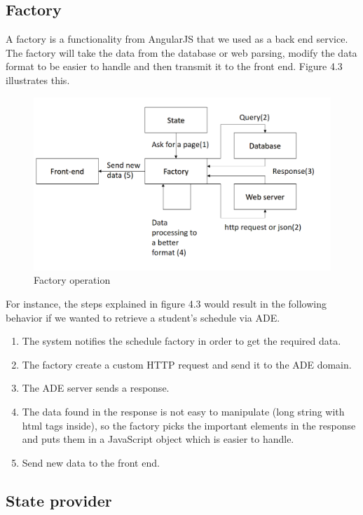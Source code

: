 \documentclass{eplmastersthesis}
\begin{document}
\subsection{Factory}

A factory is a functionality from AngularJS that we used as a back end service. The factory will take the data from the database or web parsing, modify the data format to be easier to handle and then transmit it to the front end. Figure 4.3 illustrates this.\\

\begin{figure}[H]
\centering
\includegraphics[scale = 0.3]{Images/factory_arch.png}
\caption{Factory operation}
\end{figure}

For instance, the steps explained in figure 4.3 would result in the following behavior if we wanted to retrieve a student's schedule via ADE.

\begin{enumerate}
\item The system notifies the schedule factory in order to get the required data.
\item The factory create a custom HTTP request and send it to the ADE domain.
\item The ADE server sends a response.
\item The data found in the response is not easy to manipulate (long string with html tags inside), so the factory picks the important elements in the response and puts them in a JavaScript object which is easier to handle.
\item Send new data to the front end.\\
\end{enumerate}

\subsection{State provider}
\end{document}
